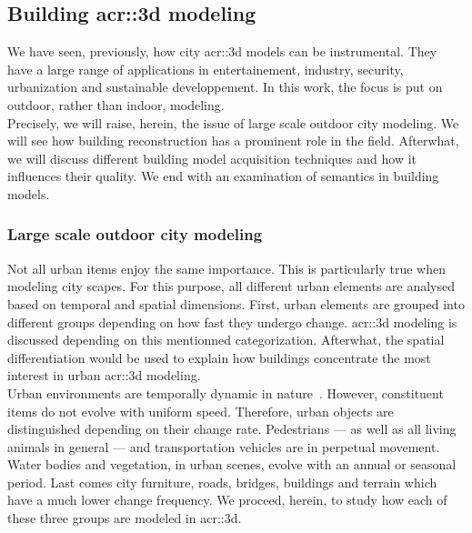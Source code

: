     \subsection{Building \gls*{acr::3d} modeling}
        \label{subsec::introduction::urban_3d_reconstruction::building_3d_modeling}
        We have seen, previously, how city \gls{acr::3d} models can be instrumental.
        They have a large range of applications in entertainement, industry, security, urbanization and sustainable developpement.
        In this work, the focus is put on outdoor, rather than indoor, modeling.\\
        Precisely, we will raise, herein, the issue of large scale outdoor city modeling.
        We will see how building reconstruction has a prominent role in the field.
        Afterwhat, we will discuss different building model acquisition techniques and how it influences their quality.
        We end with an examination of semantics in building models.

        \subsubsection{Large scale outdoor city modeling}
            Not all urban items enjoy the same importance.
            This is particularly true when modeling city scapes.
            For this purpose, all different urban elements are analysed based on temporal and spatial dimensions.
            First, urban elements are grouped into different groups depending on how fast they undergo change.
            \gls{acr::3d} modeling is discussed depending on this mentionned categorization.
            Afterwhat, the spatial differentiation would be used to explain how buildings concentrate the most interest in urban \gls{acr::3d} modeling.\\

            Urban environments are temporally dynamic in nature~\parencite{vanhoey2017varcity}.
            However, constituent items do not evolve with uniform speed.
            Therefore, urban objects are distinguished depending on their change rate.
            Pedestrians --- as well as all living animals in general --- and transportation vehicles are in perpetual movement.
            Water bodies and vegetation, in urban scenes, evolve with an annual or seasonal period.
            Last comes city furniture, roads, bridges, buildings and terrain which have a much lower change frequency.
            We proceed, herein, to study how each of these three groups are modeled in \gls{acr::3d}.\\

